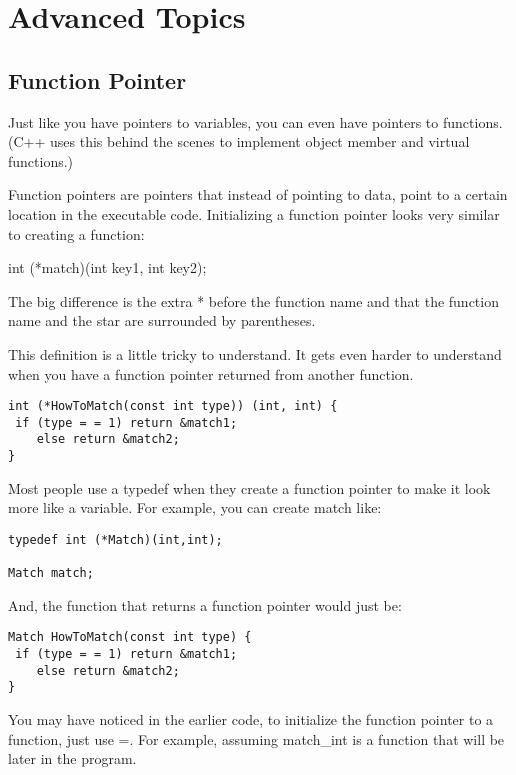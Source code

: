 
\chapter{Advanced Topics}

\section{Function Pointer}
Just like you have pointers to variables, you can even have pointers to functions. (C++ uses this behind the scenes to implement object member and virtual functions.)

Function pointers are pointers that instead of pointing to data, point to a certain location in the executable code. Initializing a function pointer looks very similar to creating a function:

int (*match)(int key1, int key2);

The big difference is the extra * before the function name and that the function name and the star are surrounded by parentheses. 

This definition is a little tricky to understand. It gets even harder to understand when you have a function pointer returned from another function.
\begin{verbatim}
int (*HowToMatch(const int type)) (int, int) { 
 if (type = = 1) return &match1; 
    else return &match2; 
} 
\end{verbatim}

Most people use a typedef when they create a function pointer to make it look more like a variable. For example, you can create match like:

\begin{verbatim}
typedef int (*Match)(int,int);

Match match;    
\end{verbatim}

 And, the function that returns a function pointer would just be:
 \begin{verbatim}
Match HowToMatch(const int type) { 
 if (type = = 1) return &match1; 
    else return &match2; 
} 
\end{verbatim}

You may have noticed in the earlier code, to initialize the function pointer to a function, just use =. For example, assuming match\_int is a function that will be later in the program.


